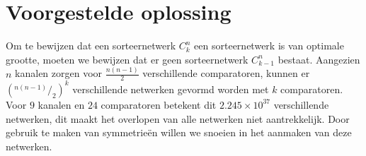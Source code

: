\documentclass{article}
\begin{document}
\newcommand*\rfrac[2]{{}^{#1}\!/_{#2}}
\section{Voorgestelde oplossing}
Om te bewijzen dat een sorteernetwerk $C^n_k$ een sorteernetwerk is van optimale grootte, moeten we bewijzen dat er geen sorteernetwerk $C^n_{k-1}$ bestaat.
Aangezien $n$ kanalen zorgen voor $\frac{n \left(n-1\right)}{2}$ verschillende comparatoren, kunnen er $\left(\rfrac{n \left(n-1\right)}{2}\right) ^k$ verschillende netwerken gevormd worden met  $k$ comparatoren.
Voor $9$ kanalen en $24$ comparatoren betekent dit $2.245 \times 10^{37}$ verschillende netwerken, dit maakt het overlopen van alle netwerken niet aantrekkelijk.
Door gebruik te maken van symmetrie\"en willen we snoeien in het aanmaken van deze netwerken.
\end{document}
